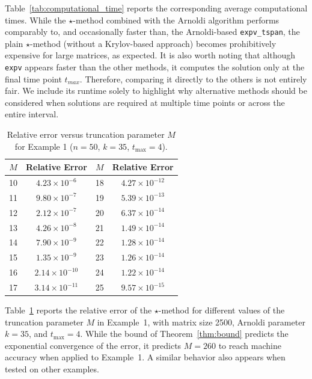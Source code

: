 \documentclass[final,1p,times,number]{elsarticle}
\theoremstyle{plain}%
\begin{document}
Table~\ref{tab:computational_time} reports the corresponding average computational times. While the $\star$-method combined with the Arnoldi algorithm performs comparably to, and occasionally faster than, the Arnoldi-based \texttt{expv\_tspan}, the plain $\star$-method (without a Krylov-based approach) becomes prohibitively expensive for large matrices, as expected.
It is also worth noting that although \texttt{expv} appears faster than the other methods, it computes the solution only at the final time point $t_{max}$. Therefore, comparing it directly to the others is not entirely fair. We include its runtime solely to highlight why alternative methods should be considered when solutions are required at multiple time points or across the entire interval.
\begin{table}[t]
\centering
\caption{Relative error versus truncation parameter $M$ for Example 1 ($n=50$, $k=35$, $t_{\max}=4$).}
\label{tab:errors_vs_M_example1}
\begin{tabular}{cc|cc}
\toprule
$M$ & Relative Error & $M$ & Relative Error \\
\midrule
10 & $4.23 \times 10^{-6}$  & 18 & $4.27 \times 10^{-12}$ \\
11 & $9.80 \times 10^{-7}$  & 19 & $5.39 \times 10^{-13}$ \\
12 & $2.12 \times 10^{-7}$  & 20 & $6.37 \times 10^{-14}$ \\
13 & $4.26 \times 10^{-8}$  & 21 & $1.49 \times 10^{-14}$ \\
14 & $7.90 \times 10^{-9}$  & 22 & $1.28 \times 10^{-14}$ \\
15 & $1.35 \times 10^{-9}$  & 23 & $1.26 \times 10^{-14}$ \\
16 & $2.14 \times 10^{-10}$ & 24 & $1.22 \times 10^{-14}$ \\
17 & $3.14 \times 10^{-11}$ & 25 & $9.57 \times 10^{-15}$ \\
\bottomrule
\end{tabular}
\end{table}
Table~\ref{tab:errors_vs_M_example1} reports the relative error of the $\star$-method for different values of the truncation parameter $M$ in Example~1, with matrix size 2500, Arnoldi parameter $k=35$, and $t_{\max}=4$.
 While the bound of Theorem~\ref{thm:bound} predicts the exponential convergence of the error, it predicts $M=260$ to reach machine accuracy when applied to Example~1. A similar behavior also appears when tested on other examples. 
\end{document}
